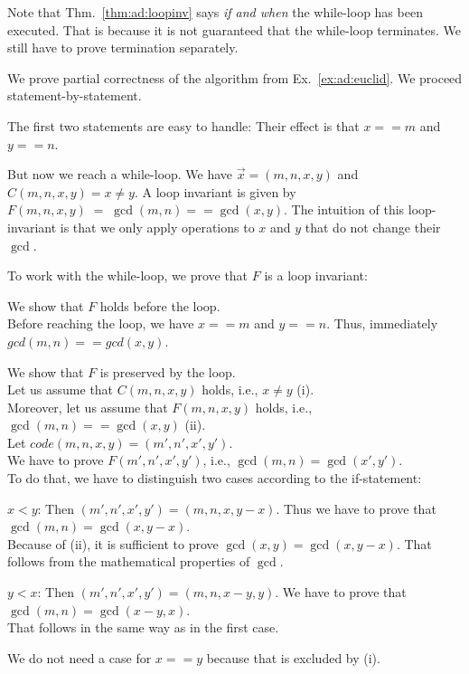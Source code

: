 Note that Thm.~\ref{thm:ad:loopinv} says \emph{if and when} the while-loop has been executed.
That is because it is not guaranteed that the while-loop terminates.
We still have to prove termination separately.

\begin{example}\label{ex:ad:euclid:partcorr}
We prove partial correctness of the algorithm from Ex.~\ref{ex:ad:euclid}.
We proceed statement-by-statement.
\medskip

The first two statements are easy to handle: Their effect is that $x==m$ and $y==n$.
\medskip

But now we reach a while-loop.
We have $\vec{x}=(m,n,x,y)$ and $C(m,n,x,y)=x\neq y$.
A loop invariant is given by $F(m,n,x,y)\;=\;\gcd(m,n)==\gcd(x,y)$.
The intuition of this loop-invariant is that we only apply operations to $x$ and $y$ that do not change their $\gcd$.
\medskip

To work with the while-loop, we prove that $F$ is a loop invariant:
\begin{compactitem}
 \item We show that $F$ holds before the loop. \\ Before reaching the loop, we have $x==m$ and $y==n$. Thus, immediately $gcd(m,n)==gcd(x,y)$.
 \item We show that $F$ is preserved by the loop. \\ Let us assume that $C(m,n,x,y)$ holds, i.e., $x\neq y$ (i).\\
  Moreover, let us assume that $F(m,n,x,y)$ holds, i.e., $\gcd(m,n)==\gcd(x,y)$ (ii).\\
  Let $code(m,n,x,y)=(m',n',x',y')$.\\
  We have to prove $F(m',n',x',y')$, i.e., $\gcd(m,n)=\gcd(x',y')$.\\
  To do that, we have to distinguish two cases according to the if-statement:
  \begin{compactitem}
   \item $x<y$: Then $(m',n',x',y') = (m,n,x,y-x)$.
   Thus we have to prove that $\gcd(m,n)=\gcd(x,y-x)$.\\
   Because of (ii), it is sufficient to prove $\gcd(x,y)=\gcd(x,y-x)$.
   That follows from the mathematical properties of $\gcd$.
   \item $y<x$: Then $(m',n',x',y') = (m,n,x-y,y)$.
   We have to prove that $\gcd(m,n)=\gcd(x-y,x)$.\\
   That follows in the same way as in the first case.
   \item We do not need a case for $x==y$ because that is excluded by (i).
  \end{compactitem}
\end{compactitem}
\medskip


\end{example}
